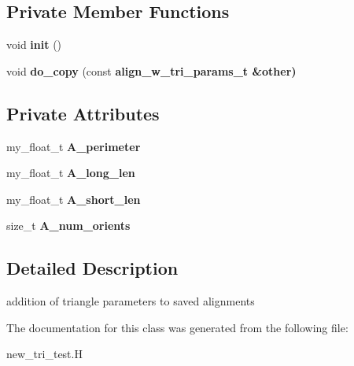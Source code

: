 \subsection*{Private Member Functions}
\begin{CompactItemize}
\item 
void \textbf{init} ()\label{classSimSite3D_1_1align__w__tri__params__t_21f99cdf72bd080020c80bb787238850}

\item 
void \textbf{do\_\-copy} (const \bf{align\_\-w\_\-tri\_\-params\_\-t} \&other)\label{classSimSite3D_1_1align__w__tri__params__t_d13773949adc8a04a545163e0c0bd70b}

\end{CompactItemize}
\subsection*{Private Attributes}
\begin{CompactItemize}
\item 
my\_\-float\_\-t \textbf{A\_\-perimeter}\label{classSimSite3D_1_1align__w__tri__params__t_809692e4cdff137a10bcc0a6d3435f22}

\item 
my\_\-float\_\-t \textbf{A\_\-long\_\-len}\label{classSimSite3D_1_1align__w__tri__params__t_d8d0c543b711b70da6acbdfa4b5d2250}

\item 
my\_\-float\_\-t \textbf{A\_\-short\_\-len}\label{classSimSite3D_1_1align__w__tri__params__t_1fd1f4c5f12a0e9f777dd1eab5addde2}

\item 
size\_\-t \textbf{A\_\-num\_\-orients}\label{classSimSite3D_1_1align__w__tri__params__t_b97ddf7a0ca9396114e63dc72d72dfe2}

\end{CompactItemize}


\subsection{Detailed Description}
addition of triangle parameters to saved alignments 



The documentation for this class was generated from the following file:\begin{CompactItemize}
\item 
new\_\-tri\_\-test.H\end{CompactItemize}
